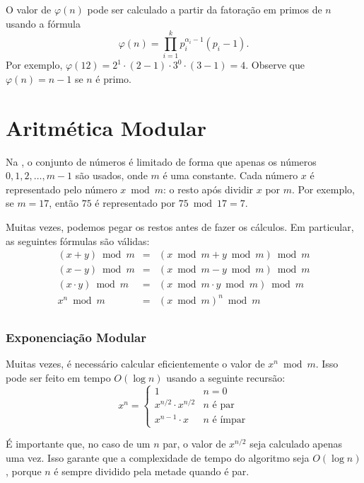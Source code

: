 O valor de $\varphi(n)$ pode ser calculado a partir da fatoração em primos de $n$ usando a fórmula
\[ \varphi(n) = \prod_{i=1}^k p_i^{\alpha_i-1}(p_i-1). \]
Por exemplo, $\varphi(12)=2^1 \cdot (2-1) \cdot 3^0 \cdot (3-1)=4$. Observe que $\varphi(n)=n-1$ se $n$ é primo.

\section{Aritmética Modular}


Na , o conjunto de números é limitado de forma que apenas os números $0,1,2,\ldots,m-1$ são usados, onde $m$ é uma constante. Cada número $x$ é representado pelo número $x \bmod m$: o resto após dividir $x$ por $m$. Por exemplo, se $m=17$, então $75$ é representado por $75 \bmod 17 = 7$.

Muitas vezes, podemos pegar os restos antes de fazer os cálculos. Em particular, as seguintes fórmulas são válidas:
\[
\begin{array}{rcl}
(x+y) \bmod m & = & (x \bmod m + y \bmod m) \bmod m \\
(x-y) \bmod m & = & (x \bmod m - y \bmod m) \bmod m \\
(x \cdot y) \bmod m & = & (x \bmod m \cdot y \bmod m) \bmod m \\
x^n \bmod m & = & (x \bmod m)^n \bmod m \\
\end{array}
\]

\subsubsection{Exponenciação Modular}

Muitas vezes, é necessário calcular eficientemente o valor de $x^n \bmod m$. Isso pode ser feito em tempo $O(\log n)$ usando a seguinte recursão:
\begin{equation*}
    x^n = \begin{cases}
               1        & n = 0\\
               x^{n/2} \cdot x^{n/2} & \text{$n$ é par}\\
               x^{n-1} \cdot x & \text{$n$ é ímpar}
           \end{cases}
\end{equation*}

É importante que, no caso de um $n$ par, o valor de $x^{n/2}$ seja calculado apenas uma vez. Isso garante que a complexidade de tempo do algoritmo seja $O(\log n)$, porque $n$ é sempre dividido pela metade quando é par.

